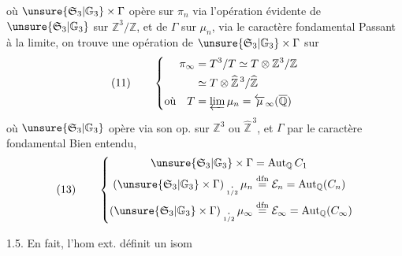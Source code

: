 où $\unsure{\mathfrak S_3|\mathbb G_3}\times\Gamma$ opère sur $\pi_n$
via l'opération évidente de $\unsure{\mathfrak S_3|\mathbb G_3}$ sur
$\mathbb Z^3/\mathbb Z$, et de $\Gamma$ sur $\mu_n$, via le caractère fondamental
Passant à la limite, on trouve une opération de
$\unsure{\mathfrak S_3|\mathbb G_3}\times\Gamma$ sur
\[
(11)\qquad\left\{\begin{aligned}
\pi_\infty&=T^3/T\simeq T\otimes\mathbb Z^3/\mathbb Z\\
&\simeq T\otimes\widehat{\mathbb Z}^{\,3}/\widehat{\mathbb Z}\\
\text{où}\quad T&=\varprojlim\mu_n=\overleftarrow\mu_\infty(\overline{\mathbb Q})
\end{aligned}\right.
\]
où $\unsure{\mathfrak S_3|\mathbb G_3}$ opère via son op. sur $\mathbb Z^3$ ou
$\widehat{\mathbb Z}^{\,3}$, et $\Gamma$ par le caractère fondamental
Bien entendu,
\[
(13)\qquad\left\{\begin{aligned}
\unsure{\mathfrak S_3|\mathbb G_3}\times\Gamma&=\operatorname{Aut}_{\mathbb Q}C_1\\
(\unsure{\mathfrak S_3|\mathbb G_3}\times\Gamma)
\mathbin{\underset{\scriptscriptstyle1/2}{.}}\mu_n
&\overset{\mathrm{dfn}}=\mathcal E_n=\operatorname{Aut}_{\mathbb Q}(C_n)\\
(\unsure{\mathfrak S_3|\mathbb G_3}\times\Gamma)
\mathbin{\underset{\scriptscriptstyle1/2}{.}}\mu_\infty
&\overset{\mathrm{dfn}}=\mathcal E_\infty=\operatorname{Aut}_{\mathbb Q}(C_\infty)
\end{aligned}\right.
\]

1.5. En fait, l'hom ext.
définit un isom

